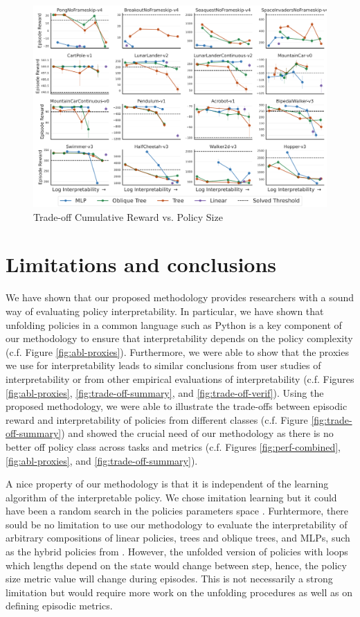 \begin{figure}[ht]
    \centering
    \includegraphics[width=0.95\linewidth]{images/images_part3/trade_off_size.pdf}
    \caption{Trade-off Cumulative Reward vs. Policy Size}
    \label{fig:trade-off-size}
\end{figure}
\section{Limitations and conclusions}\label{sec:ccl}
We have shown that our proposed methodology provides researchers with a sound way of evaluating policy interpretability. In particular, we have shown that unfolding policies in a common language such as Python is a key component of our methodology to ensure that interpretability depends on the policy complexity (c.f. Figure \ref{fig:abl-proxies}). Furthermore, we were able to show that the proxies we use for interpretability leads to similar conclusions from user studies of interpretability or from other empirical evaluations of interpretability (c.f. Figures \ref{fig:abl-proxies}, \ref{fig:trade-off-summary}, and \ref{fig:trade-off-verif}). Using the proposed methodology, we were able to illustrate the trade-offs between episodic reward and interpretability of policies from different classes (c.f. Figure \ref{fig:trade-off-summary}) and showed the crucial need of our methodology as there is no better off policy class across tasks and metrics (c.f. Figures \ref{fig:perf-combined}, \ref{fig:abl-proxies}, and \ref{fig:trade-off-summary}). 

A nice property of our methodology is that it is independent of the learning algorithm of the interpretable policy. We chose imitation learning but it could have been a random search in the policies parameters space \cite{empirical-evidence}. Furhtermore, there sould be no limitation to use our methodology to evaluate the interpretability of arbitrary compositions of linear policies, trees and oblique trees, and MLPs, such as the hybrid policies from \cite{shindo2024blendrl}. However, the unfolded version of policies with loops which lengths depend on the state would change between step, hence, the policy size metric value will change during episodes. This is not necessarily a strong limitation but would require more work on the unfolding procedures as well as on defining episodic metrics. 


